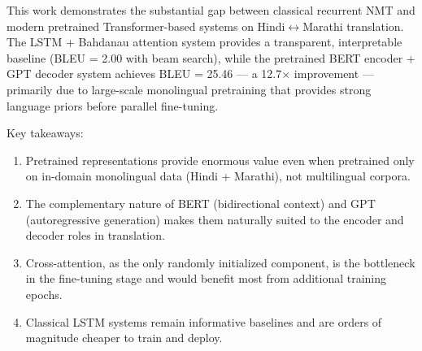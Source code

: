\documentclass[12pt,a4paper]{article}
\begin{document}
This work demonstrates the substantial gap between classical recurrent NMT and modern pretrained Transformer-based systems on Hindi$\leftrightarrow$Marathi translation. The LSTM + Bahdanau attention system provides a transparent, interpretable baseline (BLEU = 2.00 with beam search), while the pretrained BERT encoder + GPT decoder system achieves BLEU = 25.46 — a 12.7$\times$ improvement — primarily due to large-scale monolingual pretraining that provides strong language priors before parallel fine-tuning.

Key takeaways:
\begin{enumerate}
    \item Pretrained representations provide enormous value even when pretrained only on in-domain monolingual data (Hindi + Marathi), not multilingual corpora.
    \item The complementary nature of BERT (bidirectional context) and GPT (autoregressive generation) makes them naturally suited to the encoder and decoder roles in translation.
    \item Cross-attention, as the only randomly initialized component, is the bottleneck in the fine-tuning stage and would benefit most from additional training epochs.
    \item Classical LSTM systems remain informative baselines and are orders of magnitude cheaper to train and deploy.
\end{enumerate}
\end{document}
